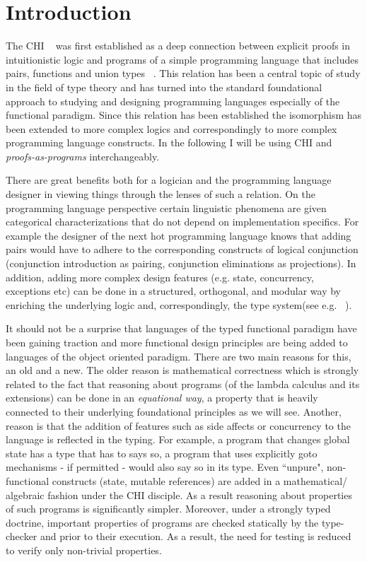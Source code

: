 \chapter{Introduction}\label{intro}
The \ac{CHI}  ~\cite{curry1934functionality,howard1995formulae} was first established as a deep connection between explicit proofs in intuitionistic logic and programs of a simple programming 
language that includes pairs, functions and union types ~\cite{Pierce:2002:TPL:509043,Srensen98lectureson}. This relation has been a central topic of study in the field of type theory and has turned into the standard
foundational approach to studying and designing programming languages especially of the functional paradigm. Since  this relation has been  established the 
isomorphism has been extended to more complex logics and correspondingly to more complex programming language constructs.  In the following I will be using \acrfull{CHI} and \emph{proofs-as-programs} interchangeably.

There are great benefits both for a logician
and the programming language designer in viewing things through the lenses of such a relation. On the programming language perspective certain linguistic phenomena are given categorical characterizations that do not 
depend on implementation specifics. For example the designer of the next hot programming language  knows that adding pairs would have to adhere to the corresponding constructs of logical conjunction (conjunction introduction as pairing, conjunction eliminations as projections). In addition, adding more complex design features (e.g. state, concurrency, exceptions etc) can be done in a structured, orthogonal, and modular way by enriching the underlying logic  and, correspondingly, the type system(see e.g. ~\cite{Harper:2012:PFP:2431407,CERVESATO20091044,Ong:1997:CFF:263699.263722,DBLP:conf/popl/Griffin90}).

It should not be a surprise that languages of the typed functional paradigm  have been gaining traction and more functional design principles are being added to languages of the object oriented paradigm. There are two main reasons for this, an old and a new. The older reason is mathematical correctness which is strongly related to the fact that reasoning about programs (of the lambda calculus and its extensions) can be done in an \textit{equational way}, a property that is heavily connected to their underlying foundational principles as we will see. Another, reason is that the addition of features such as side affects or concurrency to the language is reflected in the typing. For example,  a program that changes global state has a type that has to  says so, a program that uses explicitly goto mechanisms - if permitted - would also say so in its type. Even ``unpure", non-functional constructs (state, mutable references) are added in a mathematical/ algebraic fashion under the \ac{CHI} disciple. As a result  reasoning about properties of such programs is significantly simpler. Moreover, under a strongly typed doctrine, important properties of programs are checked statically by the type-checker and prior to their execution. As a result, the need for testing is reduced to verify only non-trivial properties. 

